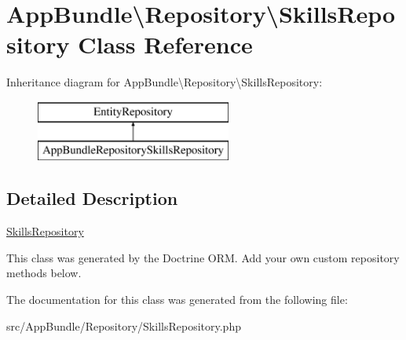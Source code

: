 \hypertarget{class_app_bundle_1_1_repository_1_1_skills_repository}{}\section{App\+Bundle\textbackslash{}Repository\textbackslash{}Skills\+Repository Class Reference}
\label{class_app_bundle_1_1_repository_1_1_skills_repository}
Inheritance diagram for App\+Bundle\textbackslash{}Repository\textbackslash{}Skills\+Repository\+:\begin{figure}[H]
\begin{center}
\leavevmode
\includegraphics[height=2.000000cm]{class_app_bundle_1_1_repository_1_1_skills_repository}
\end{center}
\end{figure}


\subsection{Detailed Description}
\mbox{\hyperlink{class_app_bundle_1_1_repository_1_1_skills_repository}{Skills\+Repository}}

This class was generated by the Doctrine O\+RM. Add your own custom repository methods below. 

The documentation for this class was generated from the following file\+:\begin{DoxyCompactItemize}
\item 
src/\+App\+Bundle/\+Repository/Skills\+Repository.\+php\end{DoxyCompactItemize}
